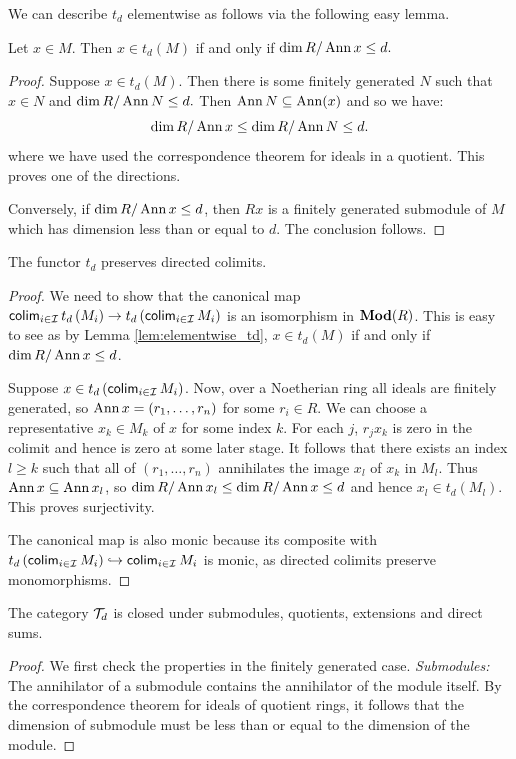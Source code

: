 \documentclass[runningheads]{llncs}
\begin{document}
\begin{textAtEnd}[category=omega3]
We can describe $t_d$ elementwise as follows via the following easy lemma.
\begin{lemma}
\label{lem:elementwise_td}
Let $x\in M$. Then $x \in t_d(M)$ if and only if $ \dim R/ \operatorname{Ann}{x} \leq d.$
\end{lemma} 
\begin{proof}
Suppose $x\in t_d(M).$ Then there is some finitely generated $N$ such that $x\in N$ and $ \dim R/ \operatorname{Ann} N \leq d.$   Then $\operatorname{Ann} N \subseteq \operatorname{Ann} (x)$ and so we have:
\begin{equation*}
\dim R / \operatorname{Ann} x \leq \dim R/ \operatorname{Ann} N \leq d.
\end{equation*}
where we have used the correspondence theorem for ideals in a quotient. This proves one of the directions. 

Conversely, if $ \dim R / \operatorname{Ann}{x} \leq d$, then $Rx$ is a finitely generated submodule of $M$ which has dimension less than or equal to $d$. The conclusion follows.
\end{proof}
\begin{lemma}
\label{lem:directed_colimits}
The functor $t_d$  preserves directed colimits.
\end{lemma} 
\begin{proof}
We need to show that the canonical map $ \operatorname{\mathsf{colim}}_{i \in \mathcal I} t_d\left(M_i\right) \to t_d\left(\operatorname{\mathsf{colim}}_{i \in \mathcal I} M_i \right) $ is an isomorphism in $\operatorname{\mathbf{Mod}}(R)$.
This is easy to see as by Lemma \ref{lem:elementwise_td}, $x \in t_d(M)$ if and only if $\dim R / \operatorname{Ann} x \leq d$.

Suppose $x \in t_d\left(\operatorname{\mathsf{colim}}_{i \in \mathcal I} M_i \right)$.
Now, over a Noetherian ring all ideals are finitely generated, so $\operatorname{Ann} x = (r_1, \dots, r_n)$ for some $r_i \in R$.
We can choose a representative $x_k \in M_k$ of $x$ for some index $k$.
For each $j$, $r_j x_k$ is zero in the colimit and hence is zero at some later stage.
It follows that there exists an index $l \geq k$ such that all of $(r_1, \dots, r_n)$ annihilates the image $x_l$ of $x_k$ in $M_l$.
Thus $\operatorname{Ann} x \subseteq \operatorname{Ann} x_l$, so $\dim R / \operatorname{Ann} x_l \leq \dim R / \operatorname{Ann} x \leq d$ and hence $x_l \in t_d\left(M_l\right)$.
This proves surjectivity.

The canonical map is also monic because its composite with $t_d\left(\operatorname{\mathsf{colim}}_{i \in \mathcal I} M_i \right) \hookrightarrow \operatorname{\mathsf{colim}}_{i \in \mathcal I} M_i$ is monic, as directed colimits preserve monomorphisms.
\end{proof}
 \begin{proposition}
The category $\mathcal T_d$ is closed under submodules, quotients, extensions and direct sums. 
\end{proposition}
\begin{proof}
We first check the properties in the finitely generated case.
\emph{Submodules:} The annihilator of a submodule contains the annihilator of the module itself. 
By the correspondence theorem for ideals of quotient rings, it follows that the dimension of submodule must be less than or equal to the dimension of the module.


\end{proof}
\end{textAtEnd}
\end{document}
